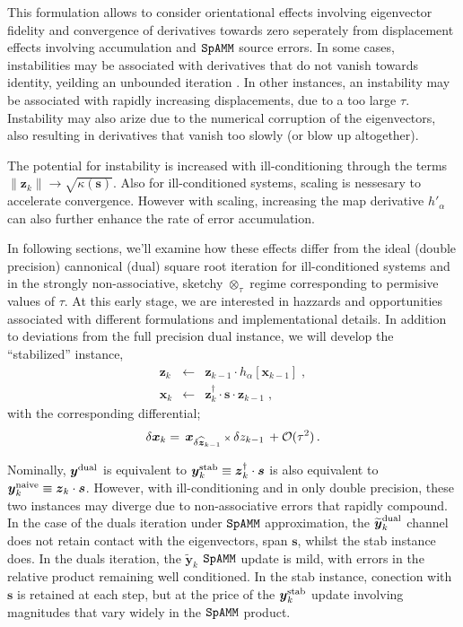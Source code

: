 \documentclass[letterpaper,twocolumn,amsmath,amsfont,amssymb,english,aps,jcp,preprintnumbers,groupaddress,nofootinbib,tightenlines]{revtex4}
\newcommand{\mat}[1]{\boldsymbol{#1}}
\newcommand{\ot}{ {\scriptstyle \otimes}_{ \tau } }
\begin{document}
This formulation allows to consider orientational effects involving eigenvector fidelity and convergence of 
derivatives towards zero seperately from displacement effects involving accumulation and $\tt SpAMM$ source errors.
In some cases, instabilities may be associated with derivatives that do not vanish towards identity, yeilding an unbounded iteration \cite{}.
In other instances, an instability may be associated with rapidly increasing displacements, due to a too large $\tau$.  Instability 
may also arize due to the numerical corruption of the eigenvectors, also resulting in derivatives that vanish too slowly (or blow up altogether).    

The potential for
instability is increased with ill-conditioning through the terms $\lVert \mat{z}_{k} \rVert  \rightarrow \sqrt{\kappa\left(\mat{s} \right)}$.
Also for ill-conditioned systems, scaling is nessesary to accelerate convergence.  However with scaling, increasing the map 
derivative $h'_\alpha$ can also further enhance the rate of error accumulation. 

In following sections, we'll examine how these effects differ from the ideal (double precision) cannonical (dual) square root iteration
for ill-conditioned systems and in the strongly non-associative, sketchy $\ot$ regime corresponding to permisive values of $\tau$.
At this early stage, we are interested in hazzards and opportunities associated with
different formulations and implementational details.   In addition to deviations from the full precision dual instance,
we will develop the  ``stabilized'' instance,
\begin{eqnarray}\label{stabilized}
\mat{z}_k &\leftarrow& \mat{z}_{k-1} \cdot h_\alpha \left[ \mat{x}_{k-1} \right] \; , \nonumber \\
\mat{x}_k &\leftarrow&  \mat{z}^\dagger_{k} \cdot \mat{s} \cdot \mat{z}_{k-1} \; ,
\end{eqnarray}
with the corresponding differential;
\begin{equation} \label{firstorderstab}
\delta \mat{x}_k = \,  { \mat{x}}_{\delta \widehat{\mat{z}}_{k-1}}  \, {\scriptstyle \times} \, \delta z_{k-1}  \, + {\cal O}(\tau^2)  \, .
\end{equation}


Nominally, $\mat{y}^{\rm dual}$ is equivalent to $\mat{y}^{\rm stab}_k \equiv \mat{z}^\dagger_{k} \cdot \mat{s}$ 
is also equivalent to $\mat{y}^{\rm naive}_k \equiv \mat{z}_{k} \cdot \mat{s}$.
However, with ill-conditioning and in only double precision, these two instances may diverge due to non-associative errors that rapidly compound.
In the case of the duals iteration under $\tt SpAMM$ approximation, the $\widetilde{\mat{y}}^{\rm dual}_k$ channel does not retain contact 
with the eigenvectors, span $\mat{s}$, whilst the stab instance does.  
In the duals iteration, the $\widetilde{\mat{y}}_k$  $\tt SpAMM$ update 
is mild, with errors in the relative product remaining well conditioned.  
In the stab instance, conection with $\mat{s}$ is retained at each step, but at the price of the 
$\mat{y}^{\rm stab}_k$ update involving magnitudes that vary widely in the $\tt SpAMM$ product.     
\end{document}
